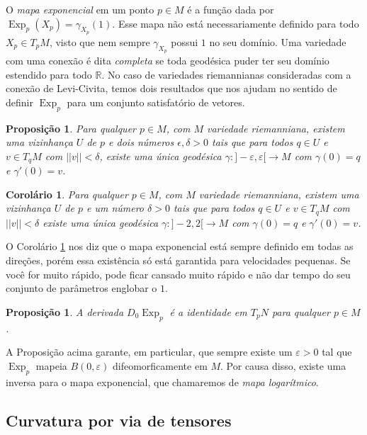 \documentclass{article}
\newtheorem{proposition}[definition]{Proposição}
\newtheorem{corollary}[definition]{Corolário}
\DeclareMathOperator{\Exp}{Exp}
\begin{document}
O \textit{mapa exponencial} em um ponto $p \in M$ é a função dada por $\Exp_p(X_p) = \gamma_{X_p}(1)$. Esse mapa não está necessariamente definido para todo $X_p \in T_pM$, visto que nem sempre $\gamma_{X_p}$ possui $1$ no seu domínio. Uma variedade com uma conexão é dita \textit{completa} se toda geodésica puder ter seu domínio estendido para todo $\mathbb{R}$. No caso de variedades riemannianas consideradas com a conexão de Levi-Civita, temos dois resultados que nos ajudam no sentido de definir $\Exp_p$ para um conjunto satisfatório de vetores.

\begin{proposition}
    Para qualquer $p \in M$, com $M$ variedade riemanniana, existem uma vizinhança $U$ de $p$ e dois números $\epsilon, \delta > 0$ tais que para todos $q \in U$ e $v \in T_qM$ com $||v|| < \delta$, existe uma única geodésica $\gamma \colon ]-\varepsilon, \varepsilon[ \to M$ com $\gamma(0) = q$ e $\gamma'(0) = v$.
\end{proposition}

\begin{corollary} \label{geodesicas_intervalo}
    Para qualquer $p \in M$, com $M$ variedade riemanniana, existem uma vizinhança $U$ de $p$ e um número $\delta > 0$ tais que para todos $q \in U$ e $v \in T_qM$ com $||v|| < \delta$ existe uma única geodésica $\gamma \colon ]-2, 2[ \to M$ com $\gamma(0) = q$ e $\gamma'(0) = v$.
\end{corollary}

O Corolário \ref{geodesicas_intervalo} nos diz que o mapa exponencial está sempre definido em todas as direções, porém essa existência só está garantida para velocidades pequenas. Se você for muito rápido, pode ficar cansado muito rápido e não dar tempo do seu conjunto de parâmetros englobar o $1$.

\begin{proposition}
    A derivada $D_0\Exp_p$ é a identidade em $T_pN$ para qualquer $p \in M$.
\end{proposition}

A Proposição acima garante, em particular, que sempre existe um $\varepsilon > 0$ tal que $\Exp_p$ mapeia $B(0, \varepsilon)$ difeomorficamente em $M$. Por causa disso, existe uma inversa para o mapa exponencial, que chamaremos de \textit{mapa logarítmico}.

\subsection{Curvatura por via de tensores}
\end{document}
